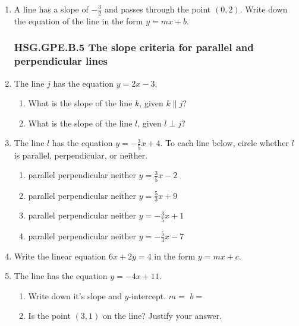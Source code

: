 \begin{enumerate}
\item A line has a slope of $-\frac{3}{2}$ and passes through the point $(0, 2)$. Write down the equation of the line in the form $y=mx+b$. \vspace{3cm}

\newpage
\subsubsection*{HSG.GPE.B.5 The slope criteria for parallel and perpendicular lines}
\item The line $j$ has the equation $y=2x-3$.
  \begin{enumerate}
    \item What is the slope of the line $k$, given $k \parallel j$?
    \vspace{1cm}
    \item What is the slope of the line $l$, given $l \perp j$?
    \vspace{1cm}
  \end{enumerate}

\item The line $l$ has the equation $y=-\frac{3}{5}x+4$. To each line below, circle whether $l$ is parallel, perpendicular, or neither.
\begin{enumerate}
  \item parallel \quad perpendicular \quad neither \qquad $y=\frac{3}{5}x-2$
  \vspace{0.5cm}
  \item parallel \quad perpendicular \quad neither \qquad $y=\frac{5}{3}x+9$
  \vspace{0.5cm}
  \item parallel \quad perpendicular \quad neither \qquad $y=-\frac{3}{5}x+1$
  \vspace{0.5cm}
  \item parallel \quad perpendicular \quad neither \qquad $y=-\frac{5}{3}x-7$
  \vspace{0.5cm}
\end{enumerate}


\item Write the linear equation $6x+2y=4$ in the form $y=mx+c$. \vspace{4cm}

\item The line has the equation $y=-4x+11$. 
\begin{enumerate}
  \item Write down it's slope and $y$-intercept. \hspace{1cm} $m=$
  \hspace{2cm} $b=$
  \item Is the point $(3, 1)$ on the line? Justify your answer.
\end{enumerate}
\vspace{4cm}

\end{enumerate}
